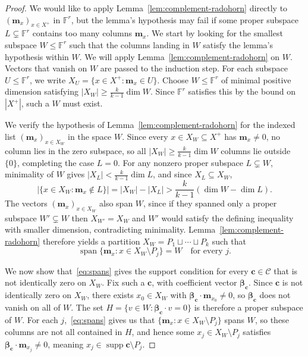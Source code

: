 \documentclass[10pt,a4paper]{amsart}
\newcommand{\F}{\mathbb{F}}
\DeclareMathOperator{\Span}{span}
\begin{document}
\begin{proof}
We would like to apply Lemma~\ref{lem:complement-radohorn} directly to
$(\mathbf{m}_x)_{x \in X^+}$ in $\F^r$, but the lemma's hypothesis may fail
if some proper subspace $L \subsetneq \F^r$ contains too many
columns $\mathbf{m}_x$. We start by looking for the smallest subspace $W \leq \F^r$ such that the
columns landing in $W$ satisfy the lemma's hypothesis within $W$. We will apply
Lemma~\ref{lem:complement-radohorn} on $W$. Vectors that vanish on $W$ are passed to the
induction step. For each subspace $U \leq \F^r$, we write $X_U = \{x \in X^+ :
\mathbf{m}_x \in U\}$.
Choose $W \leq \F^r$ of minimal positive dimension satisfying $|X_W| \geq
\frac{k}{k-1}\dim W$. Since $\F^r$ satisfies this by the bound on
$|X^+|$, such a $W$ must exist.

We verify the hypothesis of Lemma~\ref{lem:complement-radohorn} for the indexed list
$(\mathbf{m}_x)_{x \in X_W}$ in the space $W$. Since every $x \in X_W
\subseteq X^+$ has $\mathbf{m}_x \neq 0$, no column lies in the zero subspace,
so all $|X_W| \geq \frac{k}{k-1}\dim W$ columns lie outside $\{0\}$, completing
the case $L = 0$. For any nonzero proper subspace $L \subsetneq W$, minimality
of $W$ gives $|X_L| < \frac{k}{k-1}\dim L$, and since $X_L \subseteq X_W$,
$$
        |\{x \in X_W : \mathbf{m}_x \notin L\}|
        = |X_W| - |X_L|
        > \frac{k}{k-1}(\dim W - \dim L).
$$
The vectors $(\mathbf{m}_x)_{x \in X_W}$ also span $W$, since if they spanned
only a proper subspace $W' \subsetneq W$ then $X_{W'} = X_W$ and $W'$ would
satisfy the defining inequality with smaller dimension, contradicting
minimality. Lemma~\ref{lem:complement-radohorn} therefore yields a partition
$X_W = P_1 \sqcup \cdots \sqcup P_k$ such that
\begin{equation}\label{eq:spans}
        \Span\{\mathbf{m}_x : x \in X_W \setminus P_j\} = W
        \quad \text{for every } j.
\end{equation}

We now show that~\eqref{eq:spans} gives the support condition for every
$\mathbf{c} \in \mathcal C$ that is not identically zero on $X_W$. Fix such
a $\mathbf{c}$, with coefficient vector $\boldsymbol{\beta}_{\mathbf{c}}$.
Since $\mathbf{c}$ is not identically zero on $X_W$, there exists $x_0 \in
X_W$ with $\boldsymbol{\beta}_{\mathbf{c}} \cdot \mathbf{m}_{x_0} \neq 0$,
so $\boldsymbol{\beta}_{\mathbf{c}}$ does not vanish on all of $W$. The set
$H = \{v \in W : \boldsymbol{\beta}_{\mathbf{c}} \cdot v = 0\}$ is therefore a
proper subspace of $W$. For each $j$,~\eqref{eq:spans} gives us that
$\{\mathbf{m}_x : x \in X_W \setminus P_j\}$ spans $W$, so these columns are
not all contained in $H$, and hence some $x_j \in X_W \setminus P_j$ satisfies
$\boldsymbol{\beta}_{\mathbf{c}} \cdot \mathbf{m}_{x_j} \neq 0$, meaning
$x_j \in \operatorname{supp} \mathbf{c} \setminus P_j$.


\end{proof}
\end{document}
